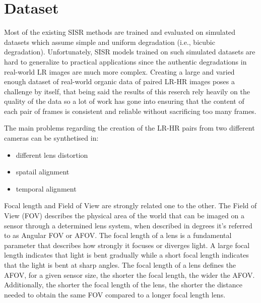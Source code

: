 \chapter{Dataset}
\label{cha:dataset}

Most of the existing SISR methods are trained and evaluated on simulated datasets which assume simple and uniform degradation (i.e., bicubic degradation). Unfortunately, SISR models trained on such simulated datasets are hard to generalize to practical applications since the authentic degradations in real-world LR images are much more complex\cite{cai2019realworld}. Creating a large and varied enough dataset of real-world organic data of paired LR-HR images poses a challenge by itself, that being said the results of this reserch rely heavily on the quality of the data so a lot of work has gone into ensuring that the content of each pair of frames is consistent and reliable without sacrificing too many frames.

The main problems regarding the creation of the LR-HR pairs from two different cameras can be synthetised in:
\begin{itemize}
  \item different lens distortion
  \item spatail alignment
  \item temporal alignment
\end{itemize}

Focal length and Field of View are strongly related one to the other. The Field of View (FOV) describes the physical area of the world that can be imaged on a sensor through a determined lens system, when described in degrees it's referred to as Angular FOV or AFOV.
The focal length of a lens is a fundamental parameter that describes how strongly it focuses or diverges light. A large focal length indicates that light is bent gradually while a short focal length indicates that the light is bent at sharp angles.
The focal length of a lens defines the AFOV, for a given sensor size, the shorter the focal length, the wider the AFOV. Additionally, the shorter the focal length of the lens, the shorter the distance needed to obtain the same FOV compared to a longer focal length lens\cite{flength}.


